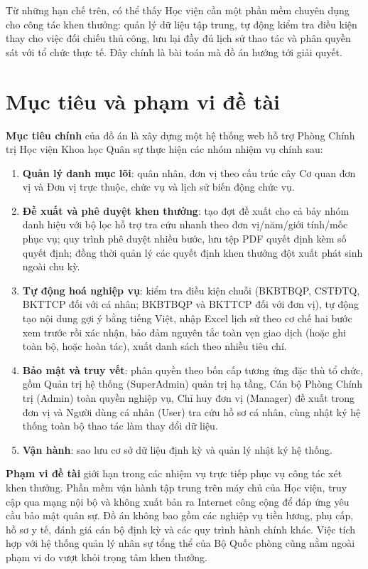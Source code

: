 \documentclass[../DoAn.tex]{subfiles}
\begin{document}
Từ những hạn chế trên, có thể thấy Học viện cần một phần mềm chuyên dụng cho công tác khen thưởng: quản lý dữ liệu tập trung, tự động kiểm tra điều kiện thay cho việc đối chiếu thủ công, lưu lại đầy đủ lịch sử thao tác và phân quyền sát với tổ chức thực tế. Đây chính là bài toán mà đồ án hướng tới giải quyết.

\section{Mục tiêu và phạm vi đề tài}
\label{section:1.2}

\textbf{Mục tiêu chính} của đồ án là xây dựng một hệ thống web hỗ trợ Phòng Chính trị Học viện Khoa học Quân sự thực hiện các nhóm nhiệm vụ chính sau:

\begin{enumerate}
    \item \textbf{Quản lý danh mục lõi}: quân nhân, đơn vị theo cấu trúc cây Cơ quan đơn vị và Đơn vị trực thuộc, chức vụ và lịch sử biến động chức vụ.
    \item \textbf{Đề xuất và phê duyệt khen thưởng}: tạo đợt đề xuất cho cả bảy nhóm danh hiệu với bộ lọc hỗ trợ tra cứu nhanh theo đơn vị/năm/giới tính/mốc phục vụ; quy trình phê duyệt nhiều bước, lưu tệp PDF quyết định kèm số quyết định; đồng thời quản lý các quyết định khen thưởng đột xuất phát sinh ngoài chu kỳ.
    \item \textbf{Tự động hoá nghiệp vụ}: kiểm tra điều kiện chuỗi (BKBTBQP, CSTĐTQ, BKTTCP đối với cá nhân; BKBTBQP và BKTTCP đối với đơn vị), tự động tạo nội dung gợi ý bằng tiếng Việt, nhập Excel lịch sử theo cơ chế hai bước xem trước rồi xác nhận, bảo đảm nguyên tắc toàn vẹn giao dịch (hoặc ghi toàn bộ, hoặc hoàn tác), xuất danh sách theo nhiều tiêu chí.
    \item \textbf{Bảo mật và truy vết}: phân quyền theo bốn cấp tương ứng đặc thù tổ chức, gồm Quản trị hệ thống (SuperAdmin) quản trị hạ tầng, Cán bộ Phòng Chính trị (Admin) toàn quyền nghiệp vụ, Chỉ huy đơn vị (Manager) đề xuất trong đơn vị và Người dùng cá nhân (User) tra cứu hồ sơ cá nhân, cùng nhật ký hệ thống toàn bộ thao tác làm thay đổi dữ liệu.
    \item \textbf{Vận hành}: sao lưu cơ sở dữ liệu định kỳ và quản lý nhật ký hệ thống.
\end{enumerate}

\textbf{Phạm vi đề tài} giới hạn trong các nhiệm vụ trực tiếp phục vụ công tác xét khen thưởng. Phần mềm vận hành tập trung trên máy chủ của Học viện, truy cập qua mạng nội bộ và không xuất bản ra Internet công cộng để đáp ứng yêu cầu bảo mật quân sự. Đồ án không bao gồm các nghiệp vụ tiền lương, phụ cấp, hồ sơ y tế, đánh giá cán bộ định kỳ và các quy trình hành chính khác. Việc tích hợp với hệ thống quản lý nhân sự tổng thể của Bộ Quốc phòng cũng nằm ngoài phạm vi do vượt khỏi trọng tâm khen thưởng.
\end{document}
